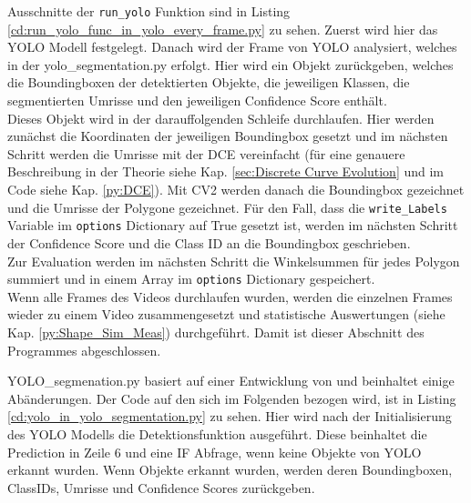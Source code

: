 {	Ausschnitte der \lstinline|run_yolo| Funktion sind in Listing \ref{cd:run_yolo_func_in_yolo_every_frame.py} zu sehen. Zuerst wird hier das YOLO Modell festgelegt. Danach wird der Frame von YOLO analysiert, welches in der yolo\_segmentation.py erfolgt. Hier wird ein Objekt zurückgeben, welches die Boundingboxen der detektierten Objekte, die jeweiligen Klassen, die segmentierten Umrisse und den jeweiligen Confidence Score enthält. \\
	Dieses Objekt wird in der darauffolgenden Schleife durchlaufen. Hier werden zunächst die Koordinaten der jeweiligen Boundingbox gesetzt und im nächsten Schritt werden die Umrisse mit der DCE vereinfacht (für eine genauere Beschreibung in der Theorie siehe Kap. \ref{sec:Discrete Curve Evolution} und im Code siehe Kap. \ref{py:DCE}). Mit CV2 werden danach die Boundingbox gezeichnet und die Umrisse der Polygone gezeichnet. Für den Fall, dass die \lstinline|write_Labels| Variable im \lstinline|options| Dictionary auf True gesetzt ist, werden im nächsten Schritt der Confidence Score und die Class ID an die Boundingbox geschrieben. \\
	Zur Evaluation werden im nächsten Schritt die Winkelsummen für jedes Polygon summiert und in einem Array im  \lstinline|options| Dictionary gespeichert. \\
	Wenn alle Frames des Videos durchlaufen wurden, werden die einzelnen Frames wieder zu einem Video zusammengesetzt und statistische Auswertungen (siehe Kap. \ref{py:Shape_Sim_Meas}) durchgeführt. Damit ist dieser Abschnitt des Programmes abgeschlossen.

	
	YOLO\_segmenation.py basiert auf einer Entwicklung von \citeauthor{Canu_pysource} \citep{Canu_pysource} und beinhaltet einige Abänderungen. Der Code auf den sich im Folgenden bezogen wird, ist in Listing \ref{cd:yolo_in_yolo_segmentation.py} zu sehen. Hier wird nach der Initialisierung des YOLO Modells die Detektionsfunktion ausgeführt. Diese beinhaltet die Prediction in Zeile 6 und eine IF Abfrage, wenn keine Objekte von YOLO erkannt wurden. Wenn Objekte erkannt wurden, werden deren Boundingboxen, ClassIDs, Umrisse und Confidence Scores zurückgeben. 

	

	}

